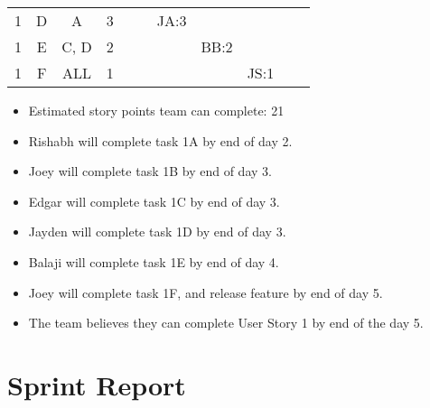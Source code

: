 \documentclass[12pt]{article}
\begin{document}
\begin{table}[H]
\begin{tabular}{@{}c|c|c|c|ccccccc@{}}
1     & D    & A          & 3                                                      &                                                 &                                                 & JA:3                                             &                                                  &                                                  &                                                  &                                                  \\
1     & E    & C, D       & 2                                                      &                                                 &                                                 &                                                  & BB:2                                             &                                                  &                                                  &                                                  \\
1     & F    & ALL        & 1                                                      &                                                 &                                                 &                                                  &                                                  & JS:1                                             &                                                  &                                                  \\ \bottomrule
\end{tabular}
\end{table}

\begin{itemize}%
\item Estimated story points team can complete: 21
\item Rishabh will complete task 1A by end of day 2.
\item Joey will complete task 1B by end of day 3.
\item Edgar will complete task 1C by end of day 3.
\item Jayden will complete task 1D by end of day 3.
\item Balaji will complete task 1E by end of day 4.
\item Joey will complete task 1F, and release feature by end of day 5.
\item The team believes they can complete User Story 1 by end of the day 5. 
\end{itemize}

\newpage

\section{Sprint Report}
\end{document}
